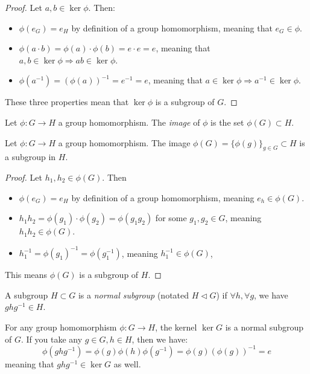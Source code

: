 \begin{proof}
  Let $a, b \in \ker \phi$. Then: 
  \begin{itemize}
    \item $\phi(e_G) = e_H$ by definition of a group homomorphism, meaning that $e_G\in\phi$. 
    \item $\phi(a \cdot b) = \phi(a) \cdot \phi(b) = e \cdot e = e$, meaning that $a, b \in \ker \phi \Rightarrow ab \in \ker \phi$. 
    \item $\phi(a^{-1}) = (\phi(a))^{-1} = e^{-1} = e$, meaning that $a \in \ker \phi \Rightarrow a^{-1} \in \ker \phi$.
  \end{itemize}
  These three properties mean that $\ker \phi$ is a subgroup of $G$. 
\end{proof}


\begin{definition}
  Let $\phi: G \to H$ a group homomorphism. The \emph{image} of $\phi$ is the set $\phi(G) \subset H$.
\end{definition}

\begin{theorem*}
  Let $\phi: G \to H$ a group homomorphism. The image $\phi(G) = \{\phi(g)\}_{g \in G} \subset H$ is a subgroup in $H$. 
\end{theorem*}

\begin{proof}
  Let $h_1, h_2 \in \phi(G)$. Then
  \begin{itemize}
    \item $\phi(e_G) = e_H$ by definition of a group homomorphism, meaning $e_h \in \phi(G)$.
    \item $h_1 h_2 = \phi(g_1) \cdot \phi(g_2) = \phi(g_1 g_2)$ for some $g_1, g_2 \in G$, meaning $h_1 h_2 \in \phi(G)$.
    \item $h_1^{-1} = \phi(g_1)^{-1} = \phi(g_1^{-1})$, meaning $h_1^{-1} \in \phi(G)$,
  \end{itemize}
  This means $\phi(G)$ is a subgroup of $H$. 
\end{proof}

\begin{definition}
  A subgroup $H \subset G$ is a \emph{normal subgroup} (notated $H  \mathrel{\triangleleft} G$) if $\forall h, \forall g$, we have $ghg^{-1} \in H$. 
\end{definition}

For any group homomorphism $\phi: G \to H$, the kernel $\ker G$ is a normal subgroup of $G$. If you take any $g \in G, h \in H$, then we have: 
\[
  \phi(ghg^{-1}) = \phi(g)\phi(h)\phi(g^{-1}) = \phi(g)(\phi(g))^{-1} = e
\]
meaning that $ghg^{-1} \in \ker G$ as well. 

